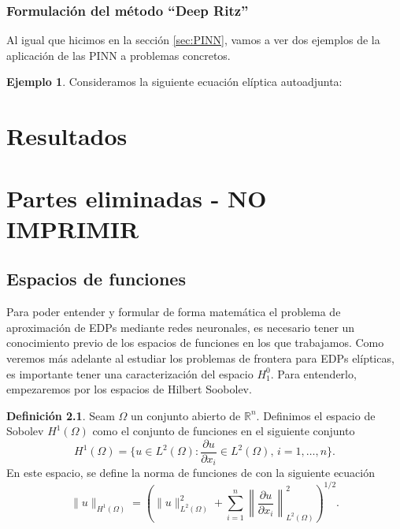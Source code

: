 \documentclass[a4paper,11pt,spanish, twoside, leqno]{tfg-uam}
\theoremstyle{definition}
\newtheorem{defin}[teor]{Definici\'on}
\newtheorem{exmp}[teor]{Ejemplo}
\begin{document}
\subsection{Formulación del método ``Deep Ritz''}

Al igual que hicimos en la sección \ref{sec:PINN}, vamos a ver dos ejemplos de la aplicación de las PINN a problemas concretos. 

\begin{exmp}
    Consideramos la siguiente ecuación elíptica autoadjunta:
\end{exmp}


\chapter{Resultados}\label{chap3}

\chapter{Partes eliminadas - NO IMPRIMIR}
\section{Espacios de funciones}

Para poder entender y formular de forma matemática el problema de aproximación de EDPs mediante redes neuronales, es necesario tener un conocimiento previo de los espacios de funciones en los que trabajamos. Como veremos más adelante al estudiar los problemas de frontera para EDPs elípticas, es importante tener una caracterización del espacio $H_1^0$. Para entenderlo, empezaremos por los espacios de Hilbert Soobolev.

\begin{mdframed}
\begin{defin}
    Seam $\Omega$ un conjunto abierto de $\mathbb{R}^n$. Definimos el espacio de Sobolev $H^1(\Omega)$ como el conjunto de funciones en el siguiente conjunto
    \begin{equation}
        H^1(\Omega)=\{u\in L^2(\Omega): \frac{\partial u}{\partial x_i}\in L^2(\Omega), \, i=1,\dots,n\}.
    \end{equation}
    En este espacio, se define la norma de funciones de con la siguiente ecuación
    \begin{equation}
        \|u\|_{H^1(\Omega)}=\left(\|u\|^2_{L^2(\Omega)} + \sum_{i=1}^{n}\left\|\frac{\partial u}{\partial x_i}\right\|^2_{L^2(\Omega)}\right)^{1/2}.
    \end{equation}
\end{defin}
\end{mdframed}
\end{document}
